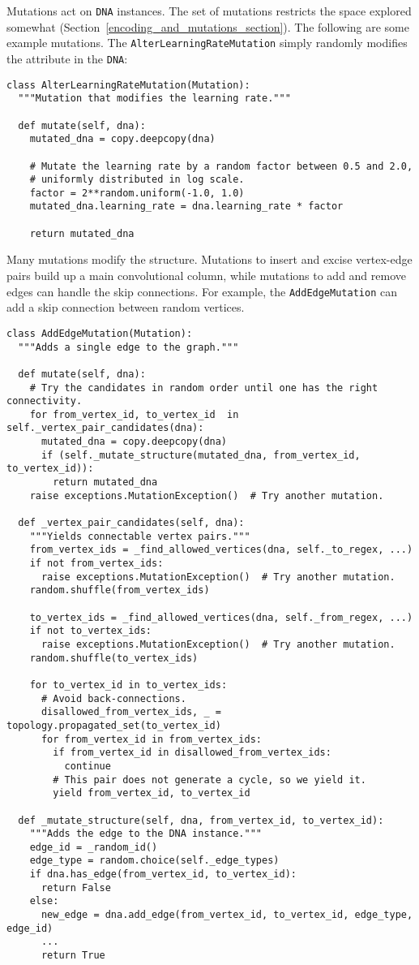 \documentclass{article}
\begin{document}
Mutations act on \lstinline{DNA} instances. The set of mutations restricts the space explored somewhat (Section~\ref{encoding_and_mutations_section}). The following are some example mutations. The \lstinline{AlterLearningRateMutation} simply randomly modifies the attribute in the \lstinline{DNA}:
\smallskip
\begin{lstlisting}
class AlterLearningRateMutation(Mutation):
  """Mutation that modifies the learning rate."""

  def mutate(self, dna):
    mutated_dna = copy.deepcopy(dna)
    
    # Mutate the learning rate by a random factor between 0.5 and 2.0,
    # uniformly distributed in log scale.
    factor = 2**random.uniform(-1.0, 1.0)
    mutated_dna.learning_rate = dna.learning_rate * factor
    
    return mutated_dna
\end{lstlisting}
Many mutations modify the structure. Mutations to insert and excise vertex-edge pairs build up a main convolutional column, while mutations to add and remove edges can handle the skip connections. For example, the \lstinline{AddEdgeMutation} can add a skip connection between random vertices.
\smallskip
\begin{lstlisting}
class AddEdgeMutation(Mutation):
  """Adds a single edge to the graph."""

  def mutate(self, dna):
    # Try the candidates in random order until one has the right connectivity.
    for from_vertex_id, to_vertex_id  in self._vertex_pair_candidates(dna):
      mutated_dna = copy.deepcopy(dna)
      if (self._mutate_structure(mutated_dna, from_vertex_id, to_vertex_id)):
        return mutated_dna
    raise exceptions.MutationException()  # Try another mutation.

  def _vertex_pair_candidates(self, dna):
    """Yields connectable vertex pairs."""
    from_vertex_ids = _find_allowed_vertices(dna, self._to_regex, ...)
    if not from_vertex_ids:
      raise exceptions.MutationException()  # Try another mutation.
    random.shuffle(from_vertex_ids)

    to_vertex_ids = _find_allowed_vertices(dna, self._from_regex, ...)
    if not to_vertex_ids:
      raise exceptions.MutationException()  # Try another mutation.
    random.shuffle(to_vertex_ids)

    for to_vertex_id in to_vertex_ids:
      # Avoid back-connections.
      disallowed_from_vertex_ids, _ = topology.propagated_set(to_vertex_id)
      for from_vertex_id in from_vertex_ids:
        if from_vertex_id in disallowed_from_vertex_ids:
          continue
        # This pair does not generate a cycle, so we yield it.
        yield from_vertex_id, to_vertex_id

  def _mutate_structure(self, dna, from_vertex_id, to_vertex_id):
    """Adds the edge to the DNA instance."""
    edge_id = _random_id()
    edge_type = random.choice(self._edge_types)
    if dna.has_edge(from_vertex_id, to_vertex_id):
      return False
    else:
      new_edge = dna.add_edge(from_vertex_id, to_vertex_id, edge_type, edge_id)
      ...
      return True
\end{lstlisting}
\end{document}
